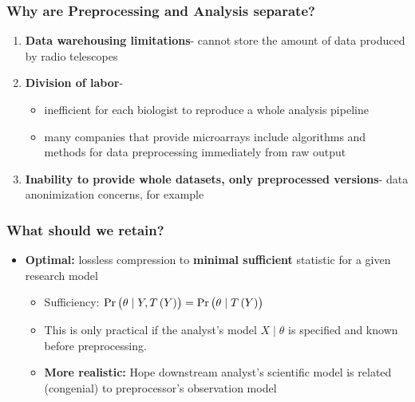 \documentclass[10pt, compress]{beamer}
\begin{document}
\begin{frame}[fragile]
    \frametitle{Why are Preprocessing and Analysis separate?}
    
    \begin{enumerate} 
    \item \textbf{Data warehousing limitations}- cannot store the amount of data produced by radio telescopes
    \vspace*{3mm}
    \item \textbf{Division of labor}- 
        \begin{itemize}
        \item inefficient for each biologist to reproduce a whole analysis pipeline 
        \item many companies that provide microarrays include algorithms and methods for data preprocessing immediately from raw output
        \end{itemize}
    \vspace*{3mm}
    \item \textbf{Inability to provide whole datasets, only preprocessed versions}- data anonimization concerns, for example
    \end{enumerate}

\end{frame}

\begin{frame}[fragile]
    \frametitle{What should we retain?}
    \begin{itemize}
        \item \textbf{Optimal:} lossless compression to \textbf{minimal sufficient} statistic for a given research model
            \begin{itemize}
                \item Sufficiency: $\Pr\del{\theta \mid Y,T\del{Y}}=\Pr\del{\theta \mid T\del{Y}}$
                \item This is only practical if the analyst's model $X \mid \theta$ is specified and known before preprocessing.
                \item \textbf{More realistic:} Hope downstream analyst's scientific model is related (congenial) to preprocessor's observation model
            \end{itemize}
    \end{itemize}
\end{frame}
\end{document}
